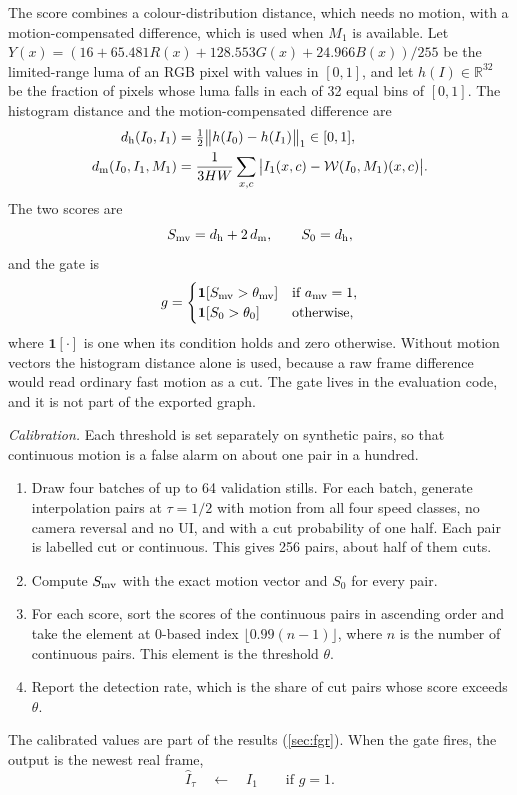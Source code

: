 The score combines a colour-distribution distance, which needs no motion, with a motion-compensated difference, which is used when $M_1$ is available. Let $Y(x)=(16+65.481R(x)+128.553G(x)+24.966B(x))/255$ be the limited-range luma of an RGB pixel with values in $[0,1]$, and let $h(I)\in\mathbb R^{32}$ be the fraction of pixels whose luma falls in each of 32 equal bins of $[0,1]$. The histogram distance and the motion-compensated difference are
\begin{align}
d_{\rm h}(I_0,I_1)&=\tfrac12\big\|h(I_0)-h(I_1)\big\|_1\in[0,1],\label{eq:fgm-hist}\\
d_{\rm m}(I_0,I_1,M_1)&=\frac{1}{3HW}\sum_{x,c}\big|I_1(x,c)-\mathcal W(I_0,M_1)(x,c)\big|.\label{eq:fgm-hist-m}
\end{align}
The two scores are
\begin{equation}
S_{\rm mv}=d_{\rm h}+2\,d_{\rm m},\qquad S_0=d_{\rm h},\label{eq:fgm-score}
\end{equation}
and the gate is
\begin{equation}
g=\begin{cases}\mathbf 1[S_{\rm mv}>\theta_{\rm mv}] & \text{if }a_{\rm mv}=1,\\ \mathbf 1[S_0>\theta_0] & \text{otherwise,}\end{cases}\label{eq:fgm-gate}
\end{equation}
where $\mathbf 1[\cdot]$ is one when its condition holds and zero otherwise. Without motion vectors the histogram distance alone is used, because a raw frame difference would read ordinary fast motion as a cut. The gate lives in the evaluation code, and it is not part of the exported graph.

\emph{Calibration.} Each threshold is set separately on synthetic pairs, so that continuous motion is a false alarm on about one pair in a hundred.
\begin{enumerate}
\item Draw four batches of up to 64 validation stills. For each batch, generate interpolation pairs at $\tau=1/2$ with motion from all four speed classes, no camera reversal and no UI, and with a cut probability of one half. Each pair is labelled cut or continuous. This gives 256 pairs, about half of them cuts.
\item Compute $S_{\rm mv}$ with the exact motion vector and $S_0$ for every pair.
\item For each score, sort the scores of the continuous pairs in ascending order and take the element at 0-based index $\lfloor0.99(n-1)\rfloor$, where $n$ is the number of continuous pairs. This element is the threshold $\theta$.
\item Report the detection rate, which is the share of cut pairs whose score exceeds $\theta$.
\end{enumerate}
The calibrated values are part of the results (\cref{sec:fgr}). When the gate fires, the output is the newest real frame,
\begin{equation}
\hat I_\tau\quad\leftarrow\quad I_1\qquad\text{if } g=1.\label{eq:fgm-gated}
\end{equation}

